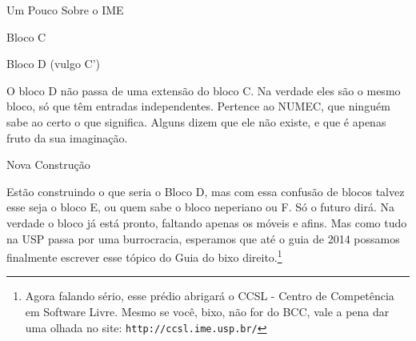 \begin{secao}{Um Pouco Sobre o IME}
\begin{subsecao}{Bloco C}
\end{subsecao}

\begin{subsecao}{Bloco D (vulgo C')}

O bloco D não passa de uma extensão do bloco C. Na verdade eles são o mesmo bloco,
só que têm entradas independentes. Pertence ao NUMEC, que ninguém sabe ao certo
o que significa. Alguns dizem que ele não existe, e que é apenas fruto da sua
imaginação.

\end{subsecao}

\begin{subsecao}{Nova Construção}

Estão construindo o que seria o Bloco D, mas com essa confusão de blocos talvez
esse seja o bloco E, ou quem sabe o bloco neperiano ou F. Só o futuro dirá. Na
verdade o bloco já está pronto, faltando apenas os móveis e afins. Mas como tudo
na USP passa por uma burrocracia, esperamos que até o guia de 2014 possamos
finalmente escrever esse tópico do Guia do bixo direito.\footnote{Agora falando
sério, esse prédio abrigará o CCSL - Centro de Competência em Software Livre.
Mesmo se você, bixo, não for do BCC, vale a pena dar uma olhada no site:
{\tt http://ccsl.ime.usp.br/}}

\end{subsecao}
\end{secao}
